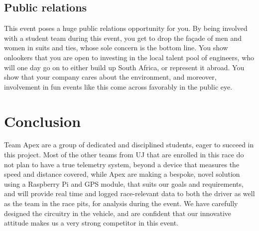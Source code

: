 \documentclass[a4paper, 12pt]{article}
\begin{document}
		\subsection{Public relations} %
		\label{sub:public_relations}
			This event poses a huge public relations opportunity for you. By being involved with a student team during this event, you get to drop the fa\c{c}ade of men and women in suits and ties, whose sole concern is the bottom line. You show onlookers that you are open to investing in the local talent pool of engineers, who will one day go on to either build up South Africa, or represent it abroad. You show that your company cares about the environment, and moreover, involvement in fun events like this come across favorably in the public eye.
	
	\section{Conclusion} %
	\label{sec:conclusion}
		Team Apex are a group of dedicated and disciplined students, eager to succeed in this project. Most of the other teams from UJ that are enrolled in this race do not plan to have a true telemetry system, beyond a device that measures the speed and distance covered, while Apex are making a bespoke, novel solution using a Raspberry Pi and GPS module, that suits our goals and requirements, and will provide real time and logged race-relevant data to both the driver as well as the team in the race pits, for analysis during the event. We have carefully designed the circuitry in the vehicle, and are confident that our innovative attitude makes us a very strong competitor in this event.
\end{document}
